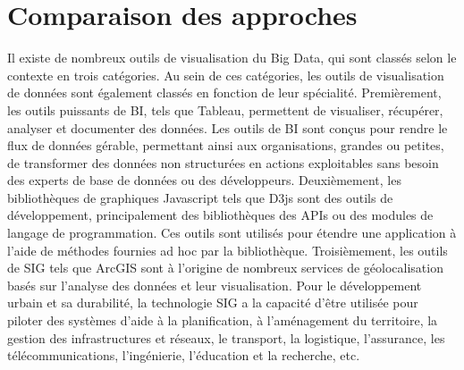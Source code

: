 \documentclass[french, a4paper, 12pt]{report}
\begin{document}
\section{Comparaison des approches }
\label{sec:comparative}
Il existe de nombreux outils de visualisation du Big Data, qui sont classés selon le contexte en trois catégories. Au sein de ces catégories, les outils de visualisation de données sont également classés en fonction de leur spécialité. 
Premièrement, les outils puissants de BI, tels que Tableau, permettent de visualiser, récupérer, analyser et documenter des données. Les outils de BI sont conçus pour rendre le flux de données gérable, permettant ainsi aux organisations, grandes ou petites, de transformer des données non structurées en actions exploitables sans besoin des experts de base de données ou des développeurs.
Deuxièmement, les bibliothèques de graphiques Javascript tels que D3js sont des outils de développement, principalement des bibliothèques des APIs ou des modules de langage de programmation. Ces outils sont utilisés pour étendre une application à l’aide de méthodes fournies ad hoc par la bibliothèque. 
Troisièmement, les outils de SIG tels que ArcGIS sont à l’origine de nombreux services de géolocalisation basés sur l’analyse des données et leur visualisation. Pour le développement urbain et sa durabilité, la technologie SIG a la capacité d’être utilisée pour piloter des systèmes d’aide à la planification, à l’aménagement du territoire, la gestion des infrastructures et réseaux, le transport, la logistique, l’assurance, les télécommunications, l’ingénierie, l’éducation et la recherche, etc. \\
\end{document}
